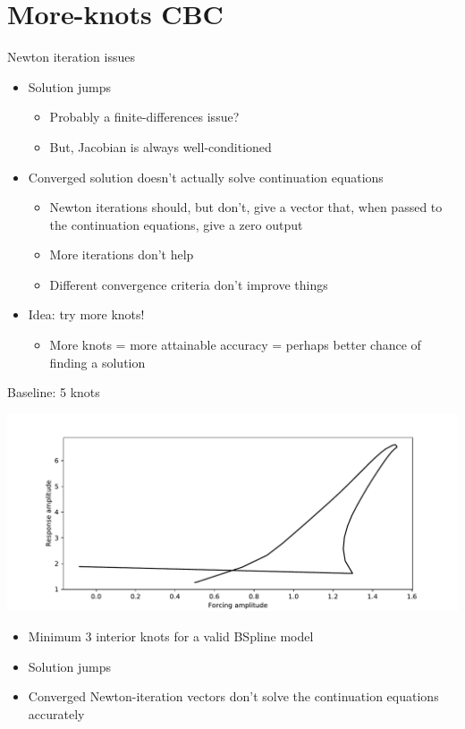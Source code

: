 \documentclass[presentation]{beamer}
\begin{document}
\section{More-knots CBC}
\label{sec:org1938be4}
\begin{frame}[label={sec:org7f4e2ae}]{Newton iteration issues}
\begin{itemize}
\item Solution jumps
\begin{itemize}
\item Probably a finite-differences issue?
\item But, Jacobian is always well-conditioned
\end{itemize}
\end{itemize}
\vfill
\begin{itemize}
\item Converged solution doesn't actually solve continuation equations
\begin{itemize}
\item Newton iterations should, but don't, give a vector that, when passed to the continuation equations, give a zero output
\item More iterations don't help
\item Different convergence criteria don't improve things
\end{itemize}
\end{itemize}
\vfill
\begin{itemize}
\item Idea: try more knots!
\begin{itemize}
\item More knots = more attainable accuracy = perhaps better chance of finding a solution
\end{itemize}
\end{itemize}
\end{frame}

\begin{frame}[label={sec:org47d787e},plain]{Baseline: 5 knots}
\begin{center}
\includegraphics[width=.9\linewidth]{./5_knots_cbc.pdf}
\end{center}

\begin{itemize}
\item Minimum 3 interior knots for a valid BSpline model
\item Solution jumps
\item Converged Newton-iteration vectors don't solve the continuation equations accurately
\end{itemize}
\end{frame}
\end{document}
